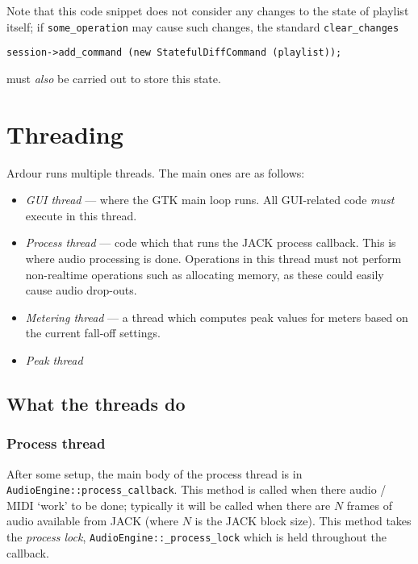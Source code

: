 \documentclass[10pt,a4paper]{book}
\newcommand{\code}[1]{\texttt{#1}}
\begin{document}
Note that this code snippet does not consider any changes to the state
of playlist itself; if \code{some\_operation} may cause such changes,
the standard \code{clear\_changes}

\begin{lstlisting}
session->add_command (new StatefulDiffCommand (playlist));
\end{lstlisting}

must \emph{also} be carried out to store this state.



\chapter{Threading}

Ardour runs multiple threads.  The main ones are as follows:

\begin{itemize}
\item \textit{GUI thread} --- where the GTK main loop runs.  All
  GUI-related code \textit{must} execute in this thread.
\item \textit{Process thread} --- code which that runs the JACK
  process callback.  This is where audio processing is done.
  Operations in this thread must not perform non-realtime operations
  such as allocating memory, as these could easily cause audio
  drop-outs.
\item \textit{Metering thread} --- a thread which computes peak values
  for meters based on the current fall-off settings.
\item \textit{Peak thread}
\end{itemize}


\section{What the threads do}

\subsection{Process thread}

After some setup, the main body of the process thread is in
\code{AudioEngine::process\_callback}.  This method is called when
there audio / MIDI `work' to be done; typically it will be called when
there are $N$ frames of audio available from JACK (where $N$ is the
JACK block size).  This method takes the \textit{process lock},
\code{AudioEngine::\_process\_lock} which is held throughout the
callback.
\end{document}
